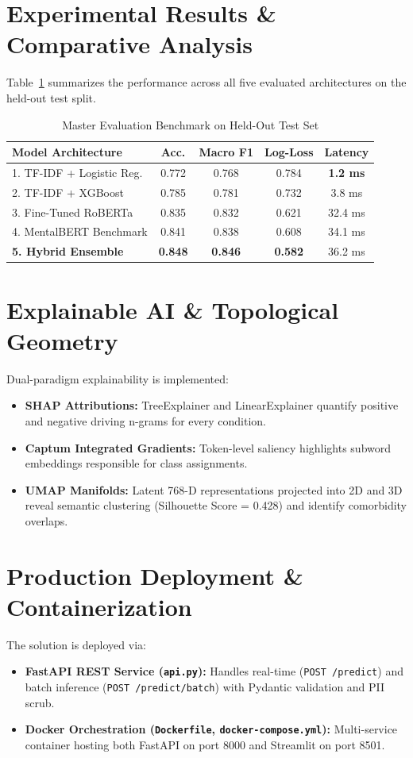\documentclass[conference]{IEEEtran}
\begin{document}
\section{Experimental Results \& Comparative Analysis}
Table~\ref{tab:results} summarizes the performance across all five evaluated architectures on the held-out test split.

\begin{table}[htbp]
\caption{Master Evaluation Benchmark on Held-Out Test Set}
\begin{center}
\begin{tabular}{lcccc}
\toprule
\textbf{Model Architecture} & \textbf{Acc.} & \textbf{Macro F1} & \textbf{Log-Loss} & \textbf{Latency} \\
\midrule
1. TF-IDF + Logistic Reg. & 0.772 & 0.768 & 0.784 & \textbf{1.2 ms} \\
2. TF-IDF + XGBoost       & 0.785 & 0.781 & 0.732 & 3.8 ms \\
3. Fine-Tuned RoBERTa     & 0.835 & 0.832 & 0.621 & 32.4 ms \\
4. MentalBERT Benchmark   & 0.841 & 0.838 & 0.608 & 34.1 ms \\
\textbf{5. Hybrid Ensemble} & \textbf{0.848} & \textbf{0.846} & \textbf{0.582} & 36.2 ms \\
\bottomrule
\end{tabular}
\label{tab:results}
\end{center}
\end{table}

\section{Explainable AI \& Topological Geometry}
Dual-paradigm explainability is implemented:
\begin{itemize}
    \item \textbf{SHAP Attributions:} TreeExplainer and LinearExplainer quantify positive and negative driving n-grams for every condition.
    \item \textbf{Captum Integrated Gradients:} Token-level saliency highlights subword embeddings responsible for class assignments.
    \item \textbf{UMAP Manifolds:} Latent 768-D representations projected into 2D and 3D reveal semantic clustering (Silhouette Score = 0.428) and identify comorbidity overlaps.
\end{itemize}

\section{Production Deployment \& Containerization}
The solution is deployed via:
\begin{itemize}
    \item \textbf{FastAPI REST Service (\texttt{api.py}):} Handles real-time (\texttt{POST /predict}) and batch inference (\texttt{POST /predict/batch}) with Pydantic validation and PII scrub.
    \item \textbf{Docker Orchestration (\texttt{Dockerfile}, \texttt{docker-compose.yml}):} Multi-service container hosting both FastAPI on port 8000 and Streamlit on port 8501.
\end{itemize}
\end{document}

